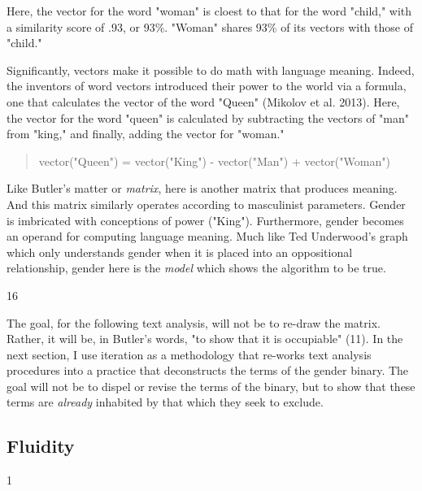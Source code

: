 \documentclass[11pt]{article}
\begin{document}
Here, the vector for the word "woman" is cloest to that for the word
"child," with a similarity score of .93, or 93\%. "Woman" shares 93\% of
its vectors with those of "child."

Significantly, vectors make it possible to do math with language
meaning. Indeed, the inventors of word vectors introduced their power
to the world via a formula, one that calculates the vector of the word
"Queen" (Mikolov et al. 2013). Here, the vector for the word "queen"
is calculated by subtracting the vectors of "man" from "king," and
finally, adding the vector for "woman."

\begin{quote}
vector("Queen") = vector("King") - vector("Man") + vector("Woman")
\end{quote}

Like Butler's matter or \emph{matrix}, here is another matrix that produces
meaning. And this matrix similarly operates according to masculinist
parameters. Gender is imbricated with conceptions of power ("King").
Furthermore, gender becomes an operand for computing language meaning.
Much like Ted Underwood's graph which only understands gender when it
is placed into an oppositional relationship, gender here is the
\emph{model} which shows the algorithm to be true.

16

The goal, for the following text analysis, will not be to re-draw the
matrix. Rather, it will be, in Butler's words, "to show that it is
occupiable" (11). In the next section, I use iteration as a
methodology that re-works text analysis procedures into a practice
that deconstructs the terms of the gender binary. The goal will not be
to dispel or revise the terms of the binary, but to show that these
terms are \emph{already} inhabited by that which they seek to exclude.

\subsection{Fluidity}
\label{sec:org0f7cf2e}
1
\end{document}
